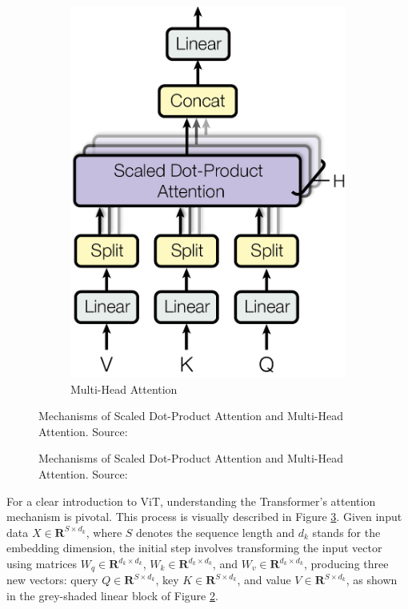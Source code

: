\begin{figure}
\begin{subfigure}[b]{0.35\textwidth}
        \label{fig:dotproductattention}
    \end{subfigure}
    \hfill
    \begin{subfigure}[b]{0.35\textwidth}
        \centering
        \includegraphics[width=\textwidth]{assets/charts_rw/Transformer_MultiHeadAttention.png}
        \caption{Multi-Head Attention}
        \label{fig:multiheadattention}
    \end{subfigure}
    \caption{Mechanisms of Scaled Dot-Product Attention and Multi-Head Attention. Source: \parencite{vaswani2017attention}}
    \caption{Mechanisms of Scaled Dot-Product Attention and Multi-Head Attention. Source: \parencite{vaswani2017attention}}
    
    \label{fig:attentionmechanism}
\end{figure}

For a clear introduction to ViT, understanding the Transformer's attention mechanism is pivotal. This process is visually described in Figure \ref{fig:attentionmechanism}. Given input data $X \in \mathbf{R}^{S \times d_k}$, where $S$ denotes the sequence length and $d_k$ stands for the embedding dimension, the initial step involves transforming the input vector using matrices $W_q \in \mathbf{R}^{d_k \times d_k}$, $W_k \in \mathbf{R}^{d_k \times d_k}$, and $W_v \in \mathbf{R}^{d_k \times d_k}$, producing three new vectors: query $Q \in \mathbf{R}^{S \times d_k}$, key $K \in \mathbf{R}^{S \times d_k}$, and value $V \in \mathbf{R}^{S \times d_k}$, as shown in the grey-shaded linear block of Figure \ref{fig:multiheadattention}.

